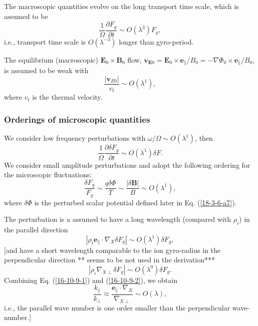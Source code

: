 \documentclass{article}
\begin{document}
The macroscopic quantities evolve on the long transport time scale, which is
assumed to be
\begin{equation}
  \frac{1}{\Omega} \frac{\partial F_g}{\partial t} \sim O (\lambda^3) F_g,
\end{equation}
i.e., transport time scale is $O (\lambda^{- 3})$ longer than gyro-period.

The equilibrium (macroscopic) $\mathbf{E}_0 \times \mathbf{B}_0$ flow,
$\mathbf{v}_{\mathbf{E}0} =\mathbf{E}_0 \times \mathbf{e}_{\parallel} / B_0 =
- \nabla \Phi_0 \times \mathbf{e}_{\parallel} / B_0$, is assumed to be weak
with
\begin{equation}
  \frac{| \mathbf{v}_{E 0} |}{v_t} \sim O (\lambda^1),
\end{equation}
where $v_t$ is the thermal velocity.

\subsubsection{Orderings of microscopic quantities}

We consider low frequency perturbations with $\omega / \Omega \sim O
(\lambda^1)$, then
\begin{equation}
  \frac{1}{\Omega} \frac{\partial \delta F_g}{\partial t} \sim O (\lambda^1)
  \delta F.
\end{equation}
We consider small amplitude perturbations and adopt the following ordering for
the microscopic fluctuations:
\begin{equation}
  \frac{\delta F_g}{F_g} \sim \frac{q \delta \Phi}{T} \sim \frac{| \delta
  \mathbf{B} |}{B} \sim O (\lambda^1),
\end{equation}
where $\delta \Phi$ is the perturbed scalar potential defined later in Eq.
(\ref{18-3-6-a7}).

The perturbation is a assumed to have a long wavelength (compared with
$\rho_i$) in the parallel direction
\begin{equation}
  \label{16-10-9-1} | \rho_i \mathbf{e}_{\parallel} \cdot \nabla_X \delta F_g
  | \sim O (\lambda^1) \delta F_g,
\end{equation}
[and have a short wavelength comparable to the ion gyro-radius in the
perpendicular direction ** seems to be not used in the derivation***
\begin{equation}
  \label{16-10-9-2} | \rho_i \nabla_{X \perp} \delta F_g | \sim O (\lambda^0)
  \delta F_g .
\end{equation}
Combining Eq. (\ref{16-10-9-1}) and (\ref{16-10-9-2}), we obtain
\begin{equation}
  \frac{k_{\parallel}}{k_{\perp}} \approx \frac{\mathbf{e}_{\parallel} \cdot
  \nabla_X}{\nabla_{X \perp}} \sim O (\lambda),
\end{equation}
i.e., the parallel wave number is one order smaller than the perpendicular
wave-number.]
\end{document}
